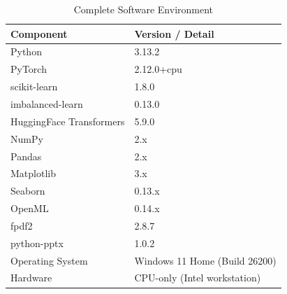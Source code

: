 \documentclass[12pt,a4paper,oneside]{report}
\begin{document}
\begin{table}[H]
  \centering
  \caption{Complete Software Environment}
  \label{tab:software}
  \begin{tabular}{L{55mm}L{80mm}}
    \toprule
    \textbf{Component} & \textbf{Version / Detail} \\
    \midrule
    Python              & 3.13.2 \\
    PyTorch             & 2.12.0+cpu \\
    scikit-learn        & 1.8.0 \\
    imbalanced-learn    & 0.13.0 \\
    HuggingFace Transformers & 5.9.0 \\
    NumPy               & 2.x \\
    Pandas              & 2.x \\
    Matplotlib          & 3.x \\
    Seaborn             & 0.13.x \\
    OpenML              & 0.14.x \\
    fpdf2               & 2.8.7 \\
    python-pptx         & 1.0.2 \\
    Operating System    & Windows 11 Home (Build 26200) \\
    Hardware            & CPU-only (Intel workstation) \\
    \bottomrule
  \end{tabular}
\end{table}
\end{document}

